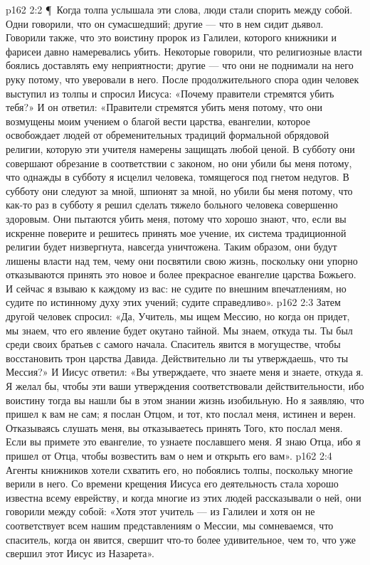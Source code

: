 \vs p162 2:2 \P\ Когда толпа услышала эти слова, люди стали спорить между собой. Одни говорили, что он сумасшедший; другие --- что в нем сидит дьявол. Говорили также, что это воистину пророк из Галилеи, которого книжники и фарисеи давно намеревались убить. Некоторые говорили, что религиозные власти боялись доставлять ему неприятности; другие --- что они не поднимали на него руку потому, что уверовали в него. После продолжительного спора один человек выступил из толпы и спросил Иисуса: «Почему правители стремятся убить тебя?» И он ответил: «Правители стремятся убить меня потому, что они возмущены моим учением о благой вести царства, евангелии, которое освобождает людей от обременительных традиций формальной обрядовой религии, которую эти учителя намерены защищать любой ценой. В субботу они совершают обрезание в соответствии с законом, но они убили бы меня потому, что однажды в субботу я исцелил человека, томящегося под гнетом недугов. В субботу они следуют за мной, шпионят за мной, но убили бы меня потому, что как\hyp{}то раз в субботу я решил сделать тяжело больного человека совершенно здоровым. Они пытаются убить меня, потому что хорошо знают, что, если вы искренне поверите и решитесь принять мое учение, их система традиционной религии будет низвергнута, навсегда уничтожена. Таким образом, они будут лишены власти над тем, чему они посвятили свою жизнь, поскольку они упорно отказываются принять это новое и более прекрасное евангелие царства Божьего. И сейчас я взываю к каждому из вас: не судите по внешним впечатлениям, но судите по истинному духу этих учений; судите справедливо».
\vs p162 2:3 Затем другой человек спросил: «Да, Учитель, мы ищем Мессию, но когда он придет, мы знаем, что его явление будет окутано тайной. Мы знаем, откуда ты. Ты был среди своих братьев с самого начала. Спаситель явится в могуществе, чтобы восстановить трон царства Давида. Действительно ли ты утверждаешь, что ты Мессия?» И Иисус ответил: «Вы утверждаете, что знаете меня и знаете, откуда я. Я желал бы, чтобы эти ваши утверждения соответствовали действительности, ибо воистину тогда вы нашли бы в этом знании жизнь изобильную. Но я заявляю, что пришел к вам не сам; я послан Отцом, и тот, кто послал меня, истинен и верен. Отказываясь слушать меня, вы отказываетесь принять Того, кто послал меня. Если вы примете это евангелие, то узнаете пославшего меня. Я знаю Отца, ибо я пришел от Отца, чтобы возвестить вам о нем и открыть его вам».
\vs p162 2:4 Агенты книжников хотели схватить его, но побоялись толпы, поскольку многие верили в него. Со времени крещения Иисуса его деятельность стала хорошо известна всему еврейству, и когда многие из этих людей рассказывали о ней, они говорили между собой: «Хотя этот учитель --- из Галилеи и хотя он не соответствует всем нашим представлениям о Мессии, мы сомневаемся, что спаситель, когда он явится, свершит что\hyp{}то более удивительное, чем то, что уже свершил этот Иисус из Назарета».
